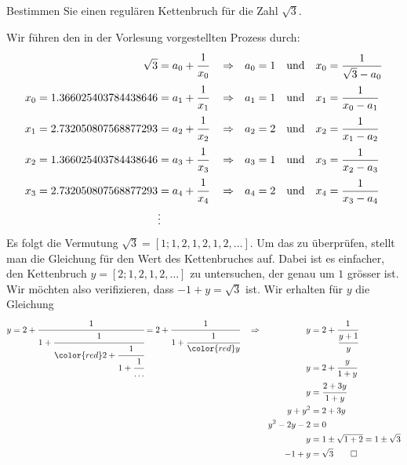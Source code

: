 Bestimmen Sie einen regulären Kettenbruch für die Zahl $\sqrt{3}$.

\begin{loesung}
Wir führen den in der Vorlesung vorgestellten Prozess durch:
\begin{align*}
\sqrt{3} &= a_0 + \cfrac{1}{x_0}
&&\Rightarrow &
a_0 &=1&&\text{und}&x_0&=\frac{1}{\sqrt{3}-a_0}
\\
x_0=1.366025403784438646&=a_1+\cfrac{1}{x_1}
&&\Rightarrow &
a_1 &=1&&\text{und}&x_1&=\frac{1}{x_0-a_1}
\\
x_1=2.732050807568877293&=a_2+\cfrac{1}{x_2}
&&\Rightarrow &
a_2 &=2&&\text{und}&x_2&=\frac{1}{x_1-a_2}
\\
x_2=1.366025403784438646&=a_3+\cfrac{1}{x_3}
&&\Rightarrow &
a_3 &=1&&\text{und}&x_3&=\frac{1}{x_2-a_3}
\\
x_3=2.732050807568877293&=a_4+\cfrac{1}{x_4}
&&\Rightarrow &
a_4 &=2&&\text{und}&x_4&=\frac{1}{x_3-a_4}
\\
&\vdots
\end{align*}
Es folgt die Vermutung $\sqrt{3} = [1;1,2,1,2,1,2,\dots]$.
Um das zu überprüfen, stellt man die Gleichung für den Wert des Kettenbruches
auf.
Dabei ist es einfacher, den Kettenbruch $y=[2;1,2,1,2,\dots]$ zu untersuchen,
der genau um $1$ grösser ist.
Wir möchten also verifizieren, dass $-1+y = \sqrt{3}$ ist.
Wir erhalten für $y$ die Gleichung 
\begin{align*}
y
&=
2 + \smash{\cfrac{1}{1+\cfrac{1}{{\color{red}2+\cfrac{1}{1+\cfrac{1}{\dots}}}}}}
=
2 + \cfrac{1}{1+\cfrac{1}{{\color{red}y}}}
&&\Rightarrow& y &=2+\cfrac{1}{\cfrac{y+1}{y}}
\\
&&&&
y&=2+\cfrac{y}{1+y}
\\
&&&&
y&=\cfrac{2+3y}{1+y}
\\
&&&&
y+y^2&=2+3y
\\
&&&&
y^2-2y-2&=0
\\
&&&&
y&=1\pm\sqrt{1+2}=1\pm\sqrt{3}
\\
&&&&
-1+y&=\sqrt{3}
\qedhere
\end{align*}
\end{loesung}
